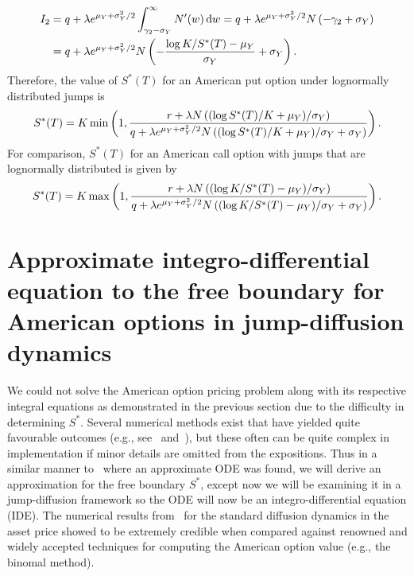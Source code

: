 	\begin{align*}
		I_2 &= q + \lambda e^{\mu_Y+\sigma_Y^2/2}\int_{\gamma_2 - \sigma_Y}^\infty N'(w) \, \mathrm d w = q + \lambda e^{\mu_Y+\sigma_Y^2/2}N\left(-\gamma_2 + \sigma_Y \right) \\
		&= q + \lambda e^{\mu_Y+\sigma_Y^2/2}N\left(-\frac{\log K/S^*(T) - \mu_Y}{\sigma_Y} + \sigma_Y \right).
	\end{align*}
Therefore, the value of $S^*(T)$ for an American put option under lognormally distributed jumps is
	\begin{equation}
		\label{eqn:freePutTLN}
		S^*(T) = K\min\left( 1, \frac{r + \lambda N \left(  (\log S^*(T)/K + \mu_Y)/\sigma_Y  \right)}{q + \lambda e^{\mu_Y+\sigma_Y^2/2}N\left((\log S^*(T)/K + \mu_Y)/\sigma_Y + \sigma_Y \right)}\right).
	\end{equation}
For comparison, $S^*(T)$ for an American call option with jumps that are lognormally distributed is given by~\cite{Chiarella2006}
		\begin{equation}
		\label{eqn:freeCallTLN}
		S^*(T) = K\max\left( 1, \frac{r + \lambda N \left(  (\log K/S^*(T) - \mu_Y)/\sigma_Y  \right)}{q + \lambda e^{\mu_Y+\sigma_Y^2/2}N\left((\log K/S^*(T) - \mu_Y)/\sigma_Y + \sigma_Y \right)}\right).
	\end{equation}
        	
        	\section{Approximate integro-differential equation to the free boundary for American options in jump-diffusion dynamics}
        	We could not solve the American option pricing problem along with its respective integral equations as demonstrated in the previous section due to the difficulty in determining $S^*$. Several numerical methods exist that have yielded quite favourable outcomes (e.g., see~\cite{Kallast2003} and~\cite{Chiarella2006}), but these often can be quite complex in implementation if minor details are omitted from the expositions. Thus in a similar manner to~\cite{Rodrigo2013} where an approximate ODE was found, we will derive an approximation for the free boundary $S^*$, except now we will be examining it in a jump-diffusion framework so the ODE will now be an integro-differential equation (IDE). The numerical results from~\cite{Rodrigo2013} for the standard diffusion dynamics in the asset price showed to be extremely credible when compared against renowned and widely accepted techniques for computing the American option value (e.g., the binomal method).
        	
